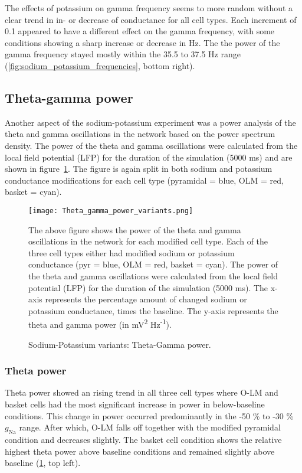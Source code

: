 The effects of potassium on gamma frequency seems to more random without a clear trend in in- or decrease of conductance for all cell types.
Each increment of 0.1 appeared to have a different effect on the gamma frequency, with some conditions showing a sharp increase or decrease in Hz.
The the power of the gamma frequency stayed mostly within the 35.5 to 37.5 Hz range (\ref{fig:sodium_potassium_frequencies}, bottom right).
\subsection{Theta-gamma power}
Another aspect of the sodium-potassium experiment was a power analysis of the theta and gamma oscillations in the network based on the power spectrum density.
The power of the theta and gamma oscillations were calculated from the local field potential (LFP) for the duration of the simulation (5000 ms) and are shown in figure~\ref{fig:sodium_potassium_power}.
The figure is again split in both sodium and potassium conductance modifications for each cell type (pyramidal = blue, OLM = red, basket = cyan).

\begin{figure}[htbp]
    \centering
    \texttt{[image: Theta\_gamma\_power\_variants.png]}
    \caption[Sodium-Potassium variants: Theta-Gamma power]{Sodium-Potassium variants: Theta-Gamma power.}\label{fig:sodium_potassium_power}
    \begin{minipage}{0.9\textwidth}
        The above figure shows the power of the theta and gamma oscillations in the network for each modified cell type.
        Each of the three cell types either had modified sodium or potassium conductance (pyr = blue, OLM = red, basket = cyan).
        The power of the theta and gamma oscillations were calculated from the local field potential (LFP) for the duration of the simulation (5000 ms).
        The x-axis represents the percentage amount of changed sodium or potassium conductance, times the baseline.
        The y-axis represents the theta and gamma power (in mV\textsuperscript{2} Hz\textsuperscript{-1}).
    \end{minipage}
\end{figure}

\subsubsection{Theta power}
Theta power showed an rising trend in all three cell types where O-LM and basket cells had the most significant increase in power in below-baseline conditions.
This change in power occurred predominantly in the -50 \% to -30 \% \(g_{\text{Na}}\) range.
After which, O-LM falls off together with the modified pyramidal condition and decreases slightly.
The basket cell condition shows the relative highest theta power above baseline conditions and remained slightly above baseline (\ref{fig:sodium_potassium_power}, top left).

